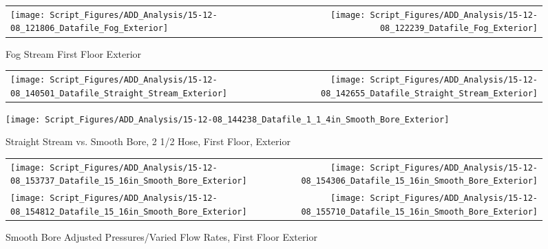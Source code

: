 \documentclass{article}
\begin{document}
\begin{appendices}
\clearpage

\begin{figure}[ht]
\begin{tabular*}{\textwidth}{lr}
\texttt{[image: Script\_Figures/ADD\_Analysis/15-12-08\_121806\_Datafile\_Fog\_Exterior]} &
\texttt{[image: Script\_Figures/ADD\_Analysis/15-12-08\_122239\_Datafile\_Fog\_Exterior]} \\
\end{tabular*}
\caption{Fog Stream First Floor Exterior}
\label{fig:Fog Stream First Floor Exterior}
\end{figure}

\clearpage

\begin{figure}[ht]
\begin{tabular*}{\textwidth}{lr}
\texttt{[image: Script\_Figures/ADD\_Analysis/15-12-08\_140501\_Datafile\_Straight\_Stream\_Exterior]} &
\texttt{[image: Script\_Figures/ADD\_Analysis/15-12-08\_142655\_Datafile\_Straight\_Stream\_Exterior]} \\
\end{tabular*}
\centering
\texttt{[image: Script\_Figures/ADD\_Analysis/15-12-08\_144238\_Datafile\_1\_1\_4in\_Smooth\_Bore\_Exterior]}
\caption{Straight Stream vs. Smooth Bore, 2 1/2 Hose, First Floor, Exterior}
\label{fig:Straight Stream vs. Smooth Bore, 2 1/2 Hose, First Floor Exterior}
\end{figure}

\clearpage

\begin{figure}[ht]
\begin{tabular*}{\textwidth}{lr}
\texttt{[image: Script\_Figures/ADD\_Analysis/15-12-08\_153737\_Datafile\_15\_16in\_Smooth\_Bore\_Exterior]} &
\texttt{[image: Script\_Figures/ADD\_Analysis/15-12-08\_154306\_Datafile\_15\_16in\_Smooth\_Bore\_Exterior]} \\
\texttt{[image: Script\_Figures/ADD\_Analysis/15-12-08\_154812\_Datafile\_15\_16in\_Smooth\_Bore\_Exterior]} &
\texttt{[image: Script\_Figures/ADD\_Analysis/15-12-08\_155710\_Datafile\_15\_16in\_Smooth\_Bore\_Exterior]} \\
\end{tabular*}
\caption{Smooth Bore Adjusted Pressures/Varied Flow Rates, First Floor Exterior}
\label{fig:Smooth Bore Adjusted Pressures/Varied Flow Rates, First Floor Exterior}
\end{figure}

\clearpage


\end{appendices}
\end{document}
